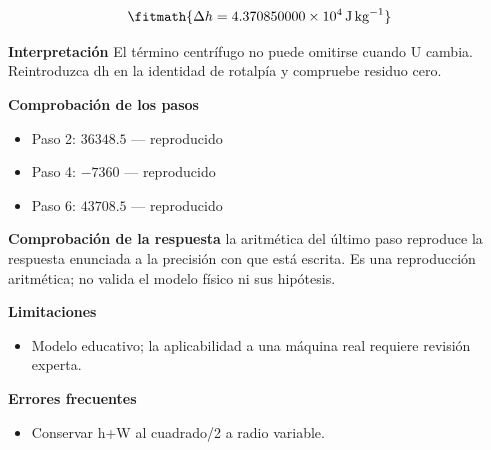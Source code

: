 \documentclass[10pt,openany]{book}
\begin{document}
\begin{tcolorbox}[title={Problema resuelto 4}, studiumworked, breakable]
\[
\fitmath{\Delta h=4.370850000\times10^{4}\,\mathrm{J}\,\mathrm{kg}^{-1}}
\]

\noindent\textbf{Interpretación}
El término centrífugo no puede omitirse cuando U cambia. Reintroduzca dh en la identidad de rotalpía y compruebe residuo cero.

\noindent\textbf{Comprobación de los pasos}
\begin{itemize}
\item Paso 2: $36348.5$ — reproducido
\item Paso 4: $-7360$ — reproducido
\item Paso 6: $43708.5$ — reproducido
\end{itemize}

\noindent\textbf{Comprobación de la respuesta} la aritmética del último paso reproduce la respuesta enunciada a la precisión con que está escrita. Es una reproducción aritmética; no valida el modelo físico ni sus hipótesis.

\noindent\textbf{Limitaciones}
\begin{itemize}
\item Modelo educativo; la aplicabilidad a una máquina real requiere revisión experta.
\end{itemize}

\noindent\textbf{Errores frecuentes}
\begin{itemize}
\item Conservar h+W al cuadrado/2 a radio variable.
\end{itemize}
\end{tcolorbox}
\end{document}
